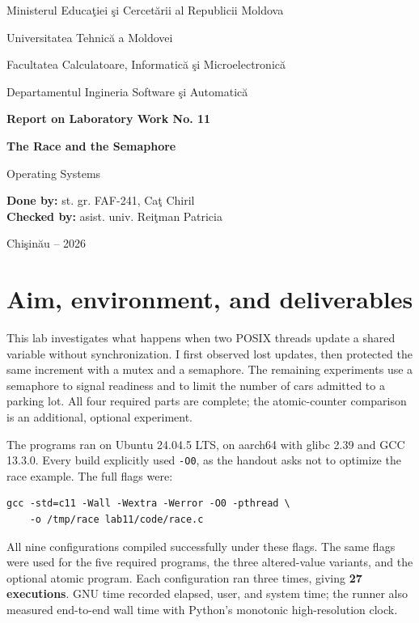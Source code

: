 \documentclass[12pt]{article}
\begin{document}
\begin{titlepage}
\centering
{\large Ministerul Educa\c{t}iei \c{s}i Cercet\u{a}rii al Republicii Moldova\par}
\vspace{0.45cm}
{\large Universitatea Tehnic\u{a} a Moldovei\par}
\vspace{0.45cm}
{\large Facultatea Calculatoare, Informatic\u{a} \c{s}i Microelectronic\u{a}\par}
\vspace{0.45cm}
{\large Departamentul Ingineria Software \c{s}i Automatic\u{a}\par}
\vspace{3cm}
{\Large\bfseries Report on Laboratory Work No. 11\par}
\vspace{0.55cm}
{\LARGE\bfseries The Race and the Semaphore\par}
\vspace{0.35cm}
{\large Operating Systems\par}
\vfill
\begin{flushleft}
\textbf{Done by:} st. gr. FAF-241, Ca\c{t} Chiril\\[0.8cm]
\textbf{Checked by:} asist. univ. Rei\c{t}man Patricia
\end{flushleft}
\vfill
{Chi\c{s}in\u{a}u -- 2026\par}
\end{titlepage}
\tableofcontents
\clearpage
{}

\section{Aim, environment, and deliverables}
This lab investigates what happens when two POSIX threads update a shared
variable without synchronization. I first observed lost updates, then
protected the same increment with a mutex and a semaphore. The remaining
experiments use a semaphore to signal readiness and to limit the number of
cars admitted to a parking lot. All four required parts are complete; the
atomic-counter comparison is an additional, optional experiment.

The programs ran on Ubuntu 24.04.5 LTS, on aarch64 with glibc 2.39 and
GCC 13.3.0. Every build explicitly used \texttt{-O0}, as the handout asks
not to optimize the race example. The full flags were:
\begin{lstlisting}
gcc -std=c11 -Wall -Wextra -Werror -O0 -pthread \
    -o /tmp/race lab11/code/race.c
\end{lstlisting}
All nine configurations compiled successfully under these flags. The same
flags were used for the five required programs, the three altered-value
variants, and the optional atomic program. Each configuration ran three
times, giving \textbf{27 executions}. GNU time recorded elapsed, user,
and system time; the runner also measured end-to-end wall time with Python's
monotonic high-resolution clock.
\end{document}
